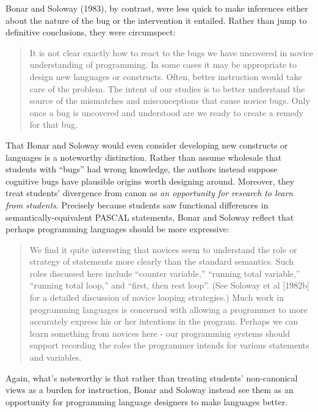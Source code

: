 Bonar and Soloway (1983), by contrast, were less quick to make
inferences either about the nature of the bug or the intervention
it entailed. Rather than jump to definitive conclusions, they were
circumspect:

\begin{quote}
  It is not clear exactly how to react to the bugs we have uncovered in
  novice understanding of programming. In some cases it may be appropriate
  to design new languages or constructs. Often, better instruction would
  take care of the problem. The intent of our studies is to better
  understand the source of the mismatches and misconceptions that cause
  novice bugs. Only once a bug is uncovered and understood are we ready to
  create a remedy for that bug. \cite{bonar_uncovering_1983}
\end{quote}

That Bonar and Soloway would even consider developing new constructs or
languages is a noteworthy distinction. Rather than assume wholesale that
students with ``bugs'' had wrong knowledge, the authors instead suppose
cognitive bugs have plausible origins worth designing around. Moreover,
they treat students' divergence from canon as \emph{an opportunity for
research to learn from students}. Precisely because students saw
functional differences in semantically-equivalent
PASCAL statements, Bonar and Soloway \cite{bonar_uncovering_1983} reflect that perhaps
programming languages should be more expressive:

\begin{quote}
  We find it quite interesting that novices seem to understand the role or
  strategy of statements more clearly than the standard semantics. Such
  roles discussed here include ``counter variable,'' ``running total
  variable,'' ``running total loop,'' and ``first, then rest loop''. (See
  Soloway et al {[}1982b{]} for a detailed discussion of novice looping
  strategies.) Much work in programming languages is concerned with
  allowing a programmer to more accurately express his or her intentions
  in the program. Perhaps we can learn something from novices here - our
  programming systems should support recording the roles the programmer
  intends for various statements and variables. \cite{bonar_uncovering_1983}
\end{quote}

Again, what's noteworthy is that rather than treating students'
non-canonical views as a burden for instruction, Bonar and Soloway
instead see them as an opportunity for programming language designers to
make languages better.


